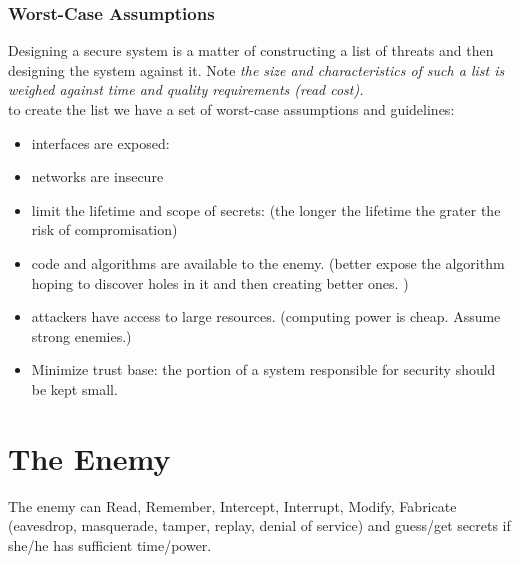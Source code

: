 \subsubsection{Worst-Case Assumptions }
Designing a secure system is a matter of constructing a list of threats and then designing the system against it. Note \textit{the size and characteristics of such a list is weighed against time and quality requirements (read cost).}\\

to create the list we have a set of worst-case assumptions and guidelines:

\begin{itemize}
\item interfaces are exposed: 
\item networks are insecure
\item limit the lifetime and scope of secrets: (the longer the lifetime the grater the risk of compromisation)
\item code and algorithms are available to the enemy. (better expose the algorithm hoping to discover holes in it and then creating better ones. )
\item attackers have access to large resources. (computing power is cheap. Assume strong enemies.)
\item Minimize trust base: the portion of a system responsible for security should be kept small. 
\end{itemize}

\section{The Enemy}

The enemy can Read, Remember, Intercept, Interrupt, Modify, Fabricate 
(eavesdrop, masquerade, tamper, replay, denial of service) and guess/get secrets if she/he has sufficient time/power.



